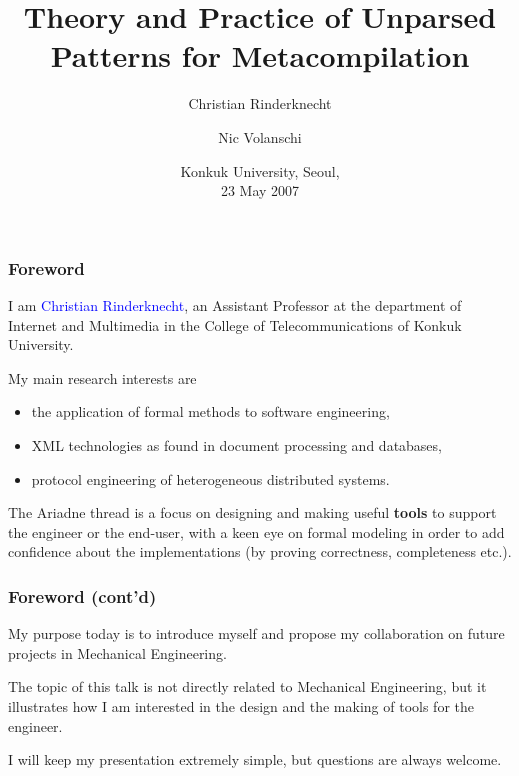 \documentclass[compress,dvips,xcolor={dvipsnames},t]{beamer}
\title{Theory and Practice of Unparsed Patterns for Metacompilation}
\author{Christian Rinderknecht \and Nic Volanschi}
\date{Konkuk University, Seoul, \\ 23 May 2007}
\begin{document}
\frame{\maketitle}

% 
\begin{frame}
\frametitle{Foreword}


I am \textcolor{blue}{Christian Rinderknecht}, an Assistant Professor
at the department of Internet and Multimedia in the College of
Telecommunications of Konkuk University.

My main research interests are
\begin{itemize}

  \item the application of formal methods to software engineering, 

  \item XML technologies as found in document processing and
    databases,

  \item protocol engineering of heterogeneous distributed systems.

\end{itemize}
The Ariadne thread is a focus on designing and making useful
\textbf{tools} to support the engineer or the end-user, with a keen
eye on formal modeling in order to add confidence about the
implementations (by proving correctness, completeness etc.).

\end{frame}

% 
\begin{frame}
\frametitle{Foreword (cont'd)}


My purpose today is to introduce myself and propose my collaboration
on future projects in Mechanical Engineering.

The topic of this talk is not directly related to Mechanical
Engineering, but it illustrates how I am interested in the design and
the making of tools for the engineer.

I will keep my presentation extremely simple, but questions are always
welcome.

\end{frame}
\end{document}
